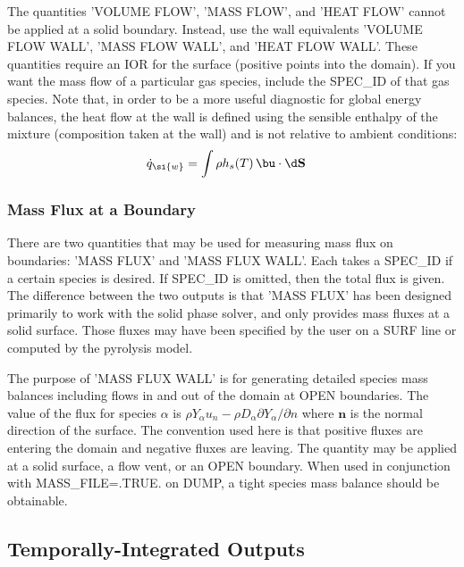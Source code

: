 \documentclass[11pt]{book}
\begin{document}
The quantities {\ct 'VOLUME FLOW'}, {\ct 'MASS FLOW'}, and {\ct 'HEAT FLOW'} cannot be applied at a solid boundary.  Instead, use the wall equivalents {\ct 'VOLUME FLOW WALL'}, {\ct 'MASS FLOW WALL'}, and {\ct 'HEAT FLOW WALL'}.  These quantities require an {\ct IOR} for the surface (positive points into the domain).  If you want the mass flow of a particular gas species, include the {\ct SPEC\_ID} of that gas species. Note that, in order to be a more useful diagnostic for global energy balances, the heat flow at the wall is defined using the sensible enthalpy of the mixture (composition taken at the wall) and is not relative to ambient conditions:
\begin{align}
\dot{q}_{\si{w}} &= \int \rho h_s(T) \, \bu \cdot \d \mathbf{S}
\end{align}

\subsubsection{Mass Flux at a Boundary}
\label{info:wallflux}

There are two quantities that may be used for measuring mass flux on boundaries: {\ct 'MASS FLUX'} and {\ct 'MASS FLUX WALL'}.  Each takes a {\ct SPEC\_ID} if a certain species is desired.  If {\ct SPEC\_ID} is omitted, then the total flux is given.  The difference between the two outputs is that {\ct 'MASS FLUX'} has been designed primarily to work with the solid phase solver, and only provides mass fluxes at a solid surface.  Those fluxes may have been specified by the user on a {\ct SURF} line or computed by the pyrolysis model.

The purpose of {\ct 'MASS FLUX WALL'} is for generating detailed species mass balances including flows in and out of the domain at {\ct OPEN} boundaries.  The value of the flux for species $\alpha$ is $\rho Y_\alpha u_n - \rho D_\alpha \partial Y_\alpha / \partial n$ where $\mathbf{n}$ is the normal direction of the surface.  The convention used here is that positive fluxes are entering the domain and negative fluxes are leaving. The quantity may be applied at a solid surface, a flow vent, or an {\ct OPEN} boundary.  When used in conjunction with {\ct MASS\_FILE=.TRUE.} on {\ct DUMP}, a tight species mass balance should be obtainable.


\subsection{Temporally-Integrated Outputs}
\label{info:time_integral}
\end{document}
